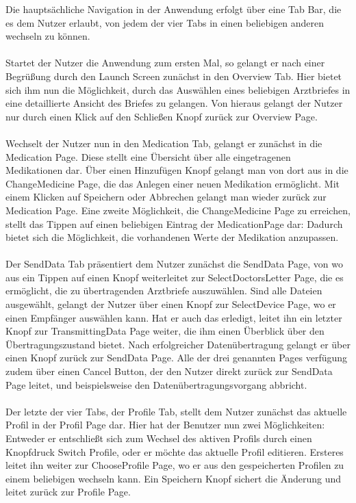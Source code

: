 \documentclass[a4paper]{scrreprt}
\begin{document}
Die hauptsächliche Navigation in der Anwendung erfolgt über eine Tab Bar, die es dem Nutzer erlaubt, von jedem der vier Tabs in einen beliebigen anderen wechseln zu können. 
\\
\\
Startet der Nutzer die Anwendung zum ersten Mal, so gelangt er nach einer Begrüßung durch den Launch Screen zunächst in den Overview Tab.
Hier bietet sich ihm nun die Möglichkeit, durch das Auswählen eines beliebigen Arztbriefes in eine detaillierte Ansicht des Briefes zu gelangen.
Von hieraus gelangt der Nutzer nur durch einen Klick auf den Schließen Knopf zurück zur Overview Page.
\\
\\
Wechselt der Nutzer nun in den Medication Tab, gelangt er zunächst in die Medication Page. Diese stellt eine Übersicht über alle eingetragenen Medikationen dar. Über einen Hinzufügen Knopf gelangt man von dort aus in die ChangeMedicine Page, die das Anlegen einer neuen Medikation ermöglicht. Mit einem Klicken auf Speichern oder Abbrechen gelangt man wieder zurück zur Medication Page. Eine zweite Möglichkeit, die ChangeMedicine Page zu erreichen, stellt das Tippen auf einen beliebigen Eintrag der MedicationPage dar: Dadurch bietet sich die Möglichkeit, die vorhandenen Werte der Medikation anzupassen.
\\
\\
Der SendData Tab präsentiert dem Nutzer zunächst die SendData Page, von wo aus ein Tippen auf einen Knopf weiterleitet zur SelectDoctorsLetter Page, die es ermöglicht, die zu übertragenden Arztbriefe auszuwählen. Sind alle Dateien ausgewählt, gelangt der Nutzer über einen Knopf zur SelectDevice Page, wo er einen Empfänger auswählen kann. Hat er auch das erledigt, leitet ihn ein letzter Knopf zur TransmittingData Page weiter, die ihm einen Überblick über den Übertragungszustand bietet. Nach erfolgreicher Datenübertragung gelangt er über einen Knopf zurück zur SendData Page.
Alle der drei genannten Pages verfügung zudem über einen Cancel Button, der den Nutzer direkt zurück zur SendData Page leitet, und beispielsweise den Datenübertragungsvorgang abbricht.
\\
\\
Der letzte der vier Tabs, der Profile Tab, stellt dem Nutzer zunächst das aktuelle Profil in der Profil Page dar. Hier hat der Benutzer nun zwei Möglichkeiten: Entweder er entschließt sich zum Wechsel des aktiven Profils durch einen Knopfdruck Switch Profile, oder er möchte das aktuelle Profil editieren. 
Ersteres leitet ihn weiter zur ChooseProfile Page, wo er aus den gespeicherten Profilen zu einem beliebigen wechseln kann. Ein Speichern Knopf sichert die Änderung und leitet zurück zur Profile Page.
\end{document}
